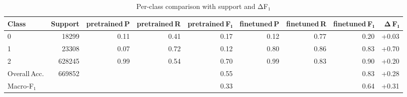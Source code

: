 \begin{table}
\caption{Per-class comparison with support and ΔF₁}
\label{table: comparison}
\begin{tabular}{l r rrr rrr r}
\toprule
Class & Support & pretrained P & pretrained R & pretrained F₁ & finetuned P & finetuned R & finetuned F₁ & Δ F₁ \\
\midrule
0 & 18299 & 0.11 & 0.41 & 0.17 & 0.12 & 0.77 & 0.20 & +0.03 \\
1 & 23308 & 0.07 & 0.72 & 0.12 & 0.80 & 0.86 & 0.83 & +0.70 \\
2 & 628245 & 0.99 & 0.54 & 0.70 & 0.99 & 0.83 & 0.90 & +0.20 \\
Overall Acc. & 669852 &  &  & 0.55 &  &  & 0.83 & +0.28 \\
Macro‑F₁ &  &  &  & 0.33 &  &  & 0.64 & +0.31 \\
\bottomrule
\end{tabular}
\end{table}
